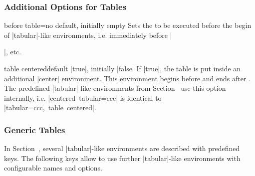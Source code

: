 \documentclass[a4paper,11pt]{ltxdoc}
\begin{document}
\clearpage
\subsubsection{Additional Options for Tables}\label{subsubsec:table_options}

\begin{docCsvKey}{before table}{=}{no default, initially empty}
  Sets the  to be executed before the begin of |tabular|-like environments,
  i.e. immediately before ||, etc.
\end{docCsvKey}




\begin{docCsvKey}[][doc new=2021-09-09]{table centered}{}{default |true|, initially |false|}
  If |true|, the table is put inside an additional |center| environment.
  This environment begins before 
  and ends after . The predefined |tabular|-like environments
  from Section~ use this option internally,
  i.e. \mbox{|centered tabular={ccc}|} is identical to
  \mbox{|tabular={ccc}, table centered|}.
\end{docCsvKey}


\clearpage
\subsubsection{Generic Tables}\label{subsubsec:table_generic}
In Section~, several |tabular|-like environments
are described with predefined keys. The following keys allow to use further
|tabular|-like environments with configurable names and options.
\end{document}
